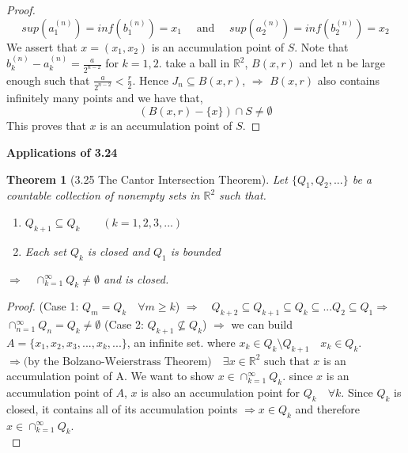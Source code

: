 \documentclass[aps,pra,notitlepage,amsmath,amssymb,letterpaper,12pt]{revtex4-1}
\newtheorem{theorem}{Theorem}
\begin{document}
\begin{proof}
$$sup(a_{1}^{(n)}) = inf(b_{1}^{(n)}) = x_{1} \quad \textrm{ and } \quad sup(a_{2}^{(n)}) = inf(b_{2}^{(n)}) = x_{2}$$
We assert that $x=(x_{1}, x_{2})$ is an accumulation point of $S$. Note that $b_{k}^{(n)}-a_{k}^{(n)} = \frac{a}{2^{n-2}}$ for $k = 1,2$. take a ball in $\mathbb{R}^{2}$, $B(x,r)$ and let n be large enough such that $\frac{a}{2^{n-2}} < \frac{r}{2}$. Hence $J_{n} \subseteq B(x,r)$, $\Rightarrow$ $B(x,r)$ also contains infinitely many points and we have that,
$$ (B(x,r)- \{x\}) \cap S \ne \emptyset $$
This proves that $x$ is an accumulation point of $S$.
\newline{}
\end{proof}

\textbf{Applications of 3.24}
\begin{theorem}[3.25 The Cantor Intersection Theorem]
Let $\{Q_{1}, Q_{2},...\}$ be a countable collection of nonempty sets in $\mathbb{R}^2$ such that.
\begin{enumerate}[\upshape i)]
\item $Q_{k+1} \subseteq Q_{k} \qquad (k=1,2,3,...)$
\item Each set $Q_{k}$ is closed and $Q_{1}$ is bounded
\end{enumerate}
$\Longrightarrow \quad \cap_{k=1}^{\infty}Q_{k} \ne \emptyset$ and is closed.
\end{theorem}
\begin{proof}
(Case 1: $Q_{m} = Q_{k} \quad \forall m \geq k$)
\newline{}
$\Rightarrow \quad Q_{k+2} \subseteq Q_{k+1} \subseteq Q_{k} \subseteq ... Q_{2} \subseteq Q_{1} \Rightarrow$
$\cap_{n=1}^{\infty} Q_{n} = Q_{k} \ne \emptyset$
\newline{}
(Case 2: $Q_{k+1} \nsubseteq Q_{k}$)
\newline{}
$\Rightarrow$ we can build $A=\{x_{1},x_{2},x_{3}, ... , x_{k},...\}$, an infinite set. where
$x_{k} \in Q_{k}\setminus Q_{k+1} \quad x_{k} \in Q_{k}$. $\Rightarrow \textrm{(by the Bolzano-Weierstrass Theorem)}\quad \exists x \in \mathbb{R}^2 \textrm{  such that } x$ is an accumulation point of A. We want to show
$x \in \cap_{k=1}^{\infty}Q_{k}$. since $x$ is an accumulation point of $A$, $x$ is also an accumulation point for $Q_{k} \quad \forall k$. Since $Q_{k}$ is closed, it contains all of its accumulation points $\Rightarrow x\in Q_{k}$ and therefore
$x \in \cap_{k=1}^{\infty}Q_{k}$.\newline{}
$$ $$
\end{proof}
\end{document}
